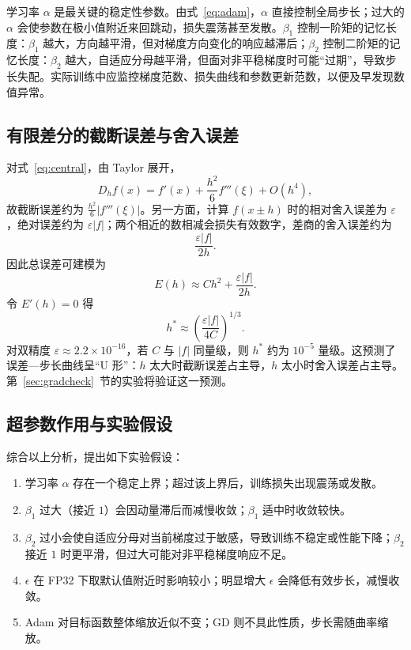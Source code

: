 \documentclass[12pt,a4paper]{ctexart}
\begin{document}
学习率 $\alpha$ 是最关键的稳定性参数。由式~\eqref{eq:adam}，$\alpha$ 直接控制全局步长；过大的 $\alpha$ 会使参数在极小值附近来回跳动，损失震荡甚至发散。$\beta_1$ 控制一阶矩的记忆长度：$\beta_1$ 越大，方向越平滑，但对梯度方向变化的响应越滞后；$\beta_2$ 控制二阶矩的记忆长度：$\beta_2$ 越大，自适应分母越平滑，但面对非平稳梯度时可能“过期”，导致步长失配。实际训练中应监控梯度范数、损失曲线和参数更新范数，以便及早发现数值异常。

\subsection{有限差分的截断误差与舍入误差}
\label{sec:fd-theory}
对式~\eqref{eq:central}，由 Taylor 展开，
\begin{equation}
D_hf(x)=f'(x)+\frac{h^2}{6}f'''(\xi)+O(h^4),
\end{equation}
故截断误差约为 $\frac{h^2}{6}|f'''(\xi)|$。另一方面，计算 $f(x\pm h)$ 时的相对舍入误差为 $\varepsilon$，绝对误差约为 $\varepsilon|f|$；两个相近的数相减会损失有效数字，差商的舍入误差约为
\begin{equation}
\frac{\varepsilon|f|}{2h}.
\end{equation}
因此总误差可建模为
\begin{equation}
E(h)\approx C h^2+\frac{\varepsilon|f|}{2h}.
\end{equation}
令 $E'(h)=0$ 得
\begin{equation}
h^*\approx\left(\frac{\varepsilon|f|}{4C}\right)^{1/3}.
\end{equation}
对双精度 $\varepsilon\approx2.2\times10^{-16}$，若 $C$ 与 $|f|$ 同量级，则 $h^*$ 约为 $10^{-5}$ 量级。这预测了误差—步长曲线呈“U 形”：$h$ 太大时截断误差占主导，$h$ 太小时舍入误差占主导。第~\ref{sec:gradcheck}~节的实验将验证这一预测。

\subsection{超参数作用与实验假设}
综合以上分析，提出如下实验假设：
\begin{enumerate}[label=H\arabic*.,itemsep=0.3em]
\item 学习率 $\alpha$ 存在一个稳定上界；超过该上界后，训练损失出现震荡或发散。
\item $\beta_1$ 过大（接近 $1$）会因动量滞后而减慢收敛；$\beta_1$ 适中时收敛较快。
\item $\beta_2$ 过小会使自适应分母对当前梯度过于敏感，导致训练不稳定或性能下降；$\beta_2$ 接近 $1$ 时更平滑，但过大可能对非平稳梯度响应不足。
\item $\epsilon$ 在 FP32 下取默认值附近时影响较小；明显增大 $\epsilon$ 会降低有效步长，减慢收敛。
\item Adam 对目标函数整体缩放近似不变；GD 则不具此性质，步长需随曲率缩放。
\end{enumerate}
\end{document}
